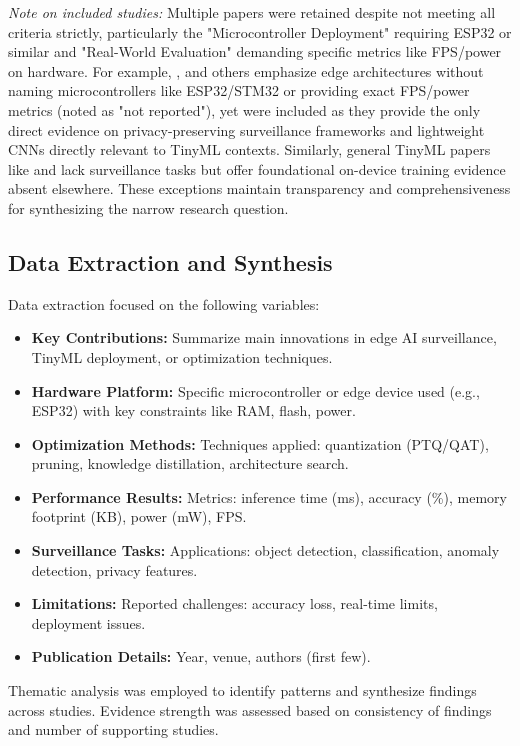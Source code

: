 \documentclass[12pt, a4paper]{article}
\begin{document}
\textit{Note on included studies:} Multiple papers were retained despite not meeting all criteria strictly, particularly the "Microcontroller Deployment" requiring ESP32 or similar and "Real-World Evaluation" demanding specific metrics like FPS/power on hardware. For example, \cite{myneni2022, zhao2020, liu2023}, and others emphasize edge architectures without naming microcontrollers like ESP32/STM32 or providing exact FPS/power metrics (noted as "not reported"), yet were included as they provide the only direct evidence on privacy-preserving surveillance frameworks and lightweight CNNs directly relevant to TinyML contexts. Similarly, general TinyML papers like \cite{aatab2023} and \cite{roveri2022} lack surveillance tasks but offer foundational on-device training evidence absent elsewhere. These exceptions maintain transparency and comprehensiveness for synthesizing the narrow research question.

\subsection{Data Extraction and Synthesis}
Data extraction focused on the following variables:
\begin{itemize}
    \item \textbf{Key Contributions:} Summarize main innovations in edge AI surveillance, TinyML deployment, or optimization techniques.
    \item \textbf{Hardware Platform:} Specific microcontroller or edge device used (e.g., ESP32) with key constraints like RAM, flash, power.
    \item \textbf{Optimization Methods:} Techniques applied: quantization (PTQ/QAT), pruning, knowledge distillation, architecture search.
    \item \textbf{Performance Results:} Metrics: inference time (ms), accuracy (\%), memory footprint (KB), power (mW), FPS.
    \item \textbf{Surveillance Tasks:} Applications: object detection, classification, anomaly detection, privacy features.
    \item \textbf{Limitations:} Reported challenges: accuracy loss, real-time limits, deployment issues.
    \item \textbf{Publication Details:} Year, venue, authors (first few).
\end{itemize}
Thematic analysis was employed to identify patterns and synthesize findings across studies. Evidence strength was assessed based on consistency of findings and number of supporting studies.
\end{document}
